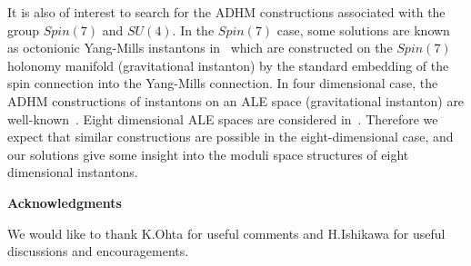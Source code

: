 \documentclass[a4paper,12pt]{article}
\begin{document}
It is also of interest to search for the ADHM constructions
associated with the group $Spin(7)$ and $SU(4)$.
In the $Spin(7)$ case, some solutions are known 
as octonionic Yang-Mills instantons in~\cite{ky} which are 
constructed on the $Spin(7)$ holonomy manifold (gravitational instanton) 
by the standard embedding of the spin connection into 
the Yang-Mills connection.
In four dimensional case, the ADHM constructions of instantons 
on an ALE space (gravitational instanton) are well-known~\cite{dm}.
Eight dimensional ALE spaces are considered in~\cite{joyce, joyce2}.
Therefore we expect that similar constructions are possible 
in the eight-dimensional case, and our solutions give some insight into 
the moduli space structures of eight dimensional instantons.





\bigskip
\bigskip
\centerline{\bf Acknowledgments}

\vskip 0.6cm

We would like to thank K.Ohta for useful comments 
and H.Ishikawa for useful discussions and 
encouragements.




\noindent

\end{document}

